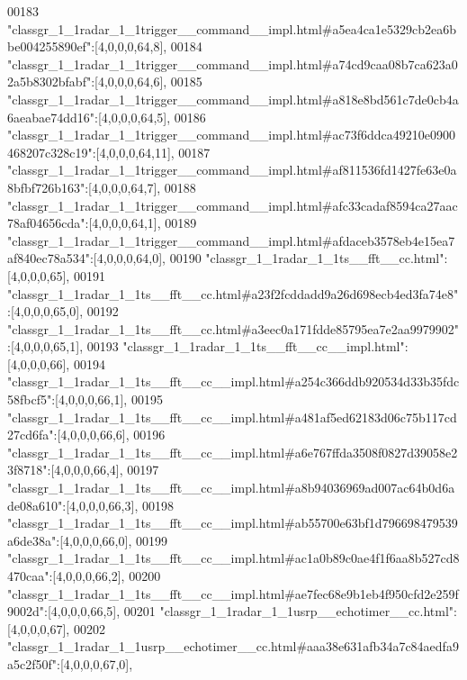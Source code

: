 \begin{DoxyCode}
00183 \textcolor{stringliteral}{"classgr\_1\_1radar\_1\_1trigger\_\_command\_\_impl.html#a5ea4ca1e5329cb2ea6bbe004255890ef"}:[4,0,0,0,64,8],
00184 \textcolor{stringliteral}{"classgr\_1\_1radar\_1\_1trigger\_\_command\_\_impl.html#a74cd9caa08b7ca623a02a5b8302bfabf"}:[4,0,0,0,64,6],
00185 \textcolor{stringliteral}{"classgr\_1\_1radar\_1\_1trigger\_\_command\_\_impl.html#a818e8bd561c7de0cb4a6aeabae74dd16"}:[4,0,0,0,64,5],
00186 \textcolor{stringliteral}{"classgr\_1\_1radar\_1\_1trigger\_\_command\_\_impl.html#ac73f6ddca49210e0900468207c328c19"}:[4,0,0,0,64,11],
00187 \textcolor{stringliteral}{"classgr\_1\_1radar\_1\_1trigger\_\_command\_\_impl.html#af811536fd1427fe63e0a8bfbf726b163"}:[4,0,0,0,64,7],
00188 \textcolor{stringliteral}{"classgr\_1\_1radar\_1\_1trigger\_\_command\_\_impl.html#afc33cadaf8594ca27aac78af04656cda"}:[4,0,0,0,64,1],
00189 \textcolor{stringliteral}{"classgr\_1\_1radar\_1\_1trigger\_\_command\_\_impl.html#afdaceb3578eb4e15ea7af840ec78a534"}:[4,0,0,0,64,0],
00190 \textcolor{stringliteral}{"classgr\_1\_1radar\_1\_1ts\_\_fft\_\_cc.html"}:[4,0,0,0,65],
00191 \textcolor{stringliteral}{"classgr\_1\_1radar\_1\_1ts\_\_fft\_\_cc.html#a23f2fcddadd9a26d698ecb4ed3fa74e8"}:[4,0,0,0,65,0],
00192 \textcolor{stringliteral}{"classgr\_1\_1radar\_1\_1ts\_\_fft\_\_cc.html#a3eec0a171fdde85795ea7e2aa9979902"}:[4,0,0,0,65,1],
00193 \textcolor{stringliteral}{"classgr\_1\_1radar\_1\_1ts\_\_fft\_\_cc\_\_impl.html"}:[4,0,0,0,66],
00194 \textcolor{stringliteral}{"classgr\_1\_1radar\_1\_1ts\_\_fft\_\_cc\_\_impl.html#a254c366ddb920534d33b35fdc58fbcf5"}:[4,0,0,0,66,1],
00195 \textcolor{stringliteral}{"classgr\_1\_1radar\_1\_1ts\_\_fft\_\_cc\_\_impl.html#a481af5ed62183d06c75b117cd27cd6fa"}:[4,0,0,0,66,6],
00196 \textcolor{stringliteral}{"classgr\_1\_1radar\_1\_1ts\_\_fft\_\_cc\_\_impl.html#a6e767ffda3508f0827d39058e23f8718"}:[4,0,0,0,66,4],
00197 \textcolor{stringliteral}{"classgr\_1\_1radar\_1\_1ts\_\_fft\_\_cc\_\_impl.html#a8b94036969ad007ac64b0d6ade08a610"}:[4,0,0,0,66,3],
00198 \textcolor{stringliteral}{"classgr\_1\_1radar\_1\_1ts\_\_fft\_\_cc\_\_impl.html#ab55700e63bf1d796698479539a6de38a"}:[4,0,0,0,66,0],
00199 \textcolor{stringliteral}{"classgr\_1\_1radar\_1\_1ts\_\_fft\_\_cc\_\_impl.html#ac1a0b89c0ae4f1f6aa8b527cd8470caa"}:[4,0,0,0,66,2],
00200 \textcolor{stringliteral}{"classgr\_1\_1radar\_1\_1ts\_\_fft\_\_cc\_\_impl.html#ae7fec68e9b1eb4f950cfd2e259f9002d"}:[4,0,0,0,66,5],
00201 \textcolor{stringliteral}{"classgr\_1\_1radar\_1\_1usrp\_\_echotimer\_\_cc.html"}:[4,0,0,0,67],
00202 \textcolor{stringliteral}{"classgr\_1\_1radar\_1\_1usrp\_\_echotimer\_\_cc.html#aaa38e631afb34a7c84aedfa9a5c2f50f"}:[4,0,0,0,67,0],

\end{DoxyCode}
